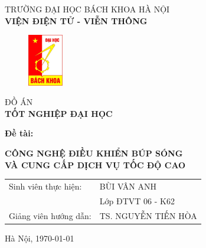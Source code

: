 \begin{titlepage}
\begin{center}
\vspace{-12pt}  TRƯỜNG ĐẠI HỌC BÁCH KHOA HÀ NỘI \\
\textbf{\fontsize{16pt}{0pt}\selectfont VIỆN ĐIỆN TỬ - VIỄN THÔNG}
\vspace{0.5cm}
 \begin{figure}[H]
     \centering
     \includegraphics[width=1.53cm,height=2.26cm]{Images/logodhbk.png}
 \end{figure}
\vspace{1.5cm}
\fontsize{24pt}{0pt}\selectfont ĐỒ ÁN\\
\vspace{12pt}
\textbf{\fontsize{32pt}{0pt}\selectfont TỐT NGHIỆP ĐẠI HỌC}
\vspace{1.5cm}
\end{center}
\hspace{6pt}\textbf{\fontsize{14pt}{0pt}\selectfont Đề tài:}
\begin{center}
    \textbf{\fontsize{20pt}{0pt}\selectfont CÔNG NGHỆ ĐIỀU KHIỂN BÚP SÓNG}\\
    \textbf{\fontsize{20pt}{0pt}\selectfont VÀ CUNG CẤP DỊCH VỤ TỐC ĐỘ CAO}

\vspace{1.5cm}
\begin{table}[H]
    \centering
    \begin{tabular}{l l}
 \fontsize{14pt}{0pt}\selectfont Sinh viên thực hiện:    & \fontsize{14pt}{0pt}\selectfont BÙI VÂN ANH \vspace{6pt} \\ 
     &\fontsize{14pt}{0pt}\selectfont Lớp ĐTVT 06 - K62 \vspace{6pt}\\
\fontsize{14pt}{0pt}\selectfont Giảng viên hướng dẫn: & \fontsize{14pt}{0pt}\selectfont TS. NGUYỄN TIẾN HÒA
\end{tabular}
\end{table}
\vspace{3.5cm}
 \fontsize{14pt}{0pt}\selectfont Hà Nội, \today
\end{center}
\end{titlepage}
